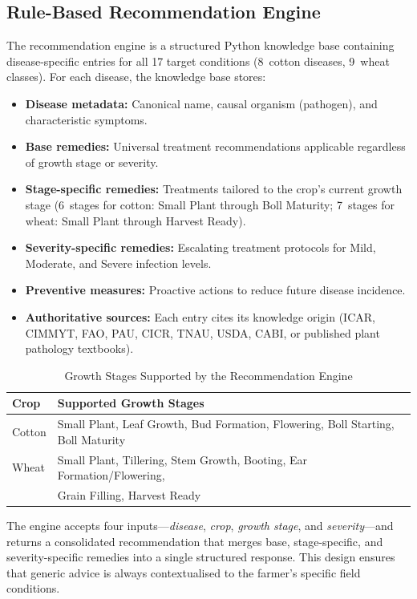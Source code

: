 \documentclass[12pt,a4paper]{report}
\begin{document}
\subsection{Rule-Based Recommendation Engine}
The recommendation engine is a structured Python knowledge base containing disease-specific entries for all 17 target conditions (8~cotton diseases, 9~wheat classes). For each disease, the knowledge base stores:

\begin{itemize}
    \item \textbf{Disease metadata:} Canonical name, causal organism (pathogen), and characteristic symptoms.
    \item \textbf{Base remedies:} Universal treatment recommendations applicable regardless of growth stage or severity.
    \item \textbf{Stage-specific remedies:} Treatments tailored to the crop's current growth stage (6~stages for cotton: Small Plant through Boll Maturity; 7~stages for wheat: Small Plant through Harvest Ready).
    \item \textbf{Severity-specific remedies:} Escalating treatment protocols for Mild, Moderate, and Severe infection levels.
    \item \textbf{Preventive measures:} Proactive actions to reduce future disease incidence.
    \item \textbf{Authoritative sources:} Each entry cites its knowledge origin (ICAR, CIMMYT, FAO, PAU, CICR, TNAU, USDA, CABI, or published plant pathology textbooks).
\end{itemize}

\begin{table}[H]
\centering
\caption{Growth Stages Supported by the Recommendation Engine}
\label{tab:growth-stages}
\begin{tabular}{ll}
\toprule
Crop & Supported Growth Stages \\
\midrule
Cotton & Small Plant, Leaf Growth, Bud Formation, Flowering, Boll Starting, Boll Maturity \\
Wheat & Small Plant, Tillering, Stem Growth, Booting, Ear Formation/Flowering, \\
       & Grain Filling, Harvest Ready \\
\bottomrule
\end{tabular}
\end{table}

The engine accepts four inputs---\textit{disease}, \textit{crop}, \textit{growth stage}, and \textit{severity}---and returns a consolidated recommendation that merges base, stage-specific, and severity-specific remedies into a single structured response. This design ensures that generic advice is always contextualised to the farmer's specific field conditions.
\end{document}

